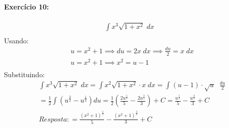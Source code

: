 \documentclass[12pt]{article}
\begin{document}
\paragraph{Exercício 10:}
\begin{align*}
\int x^{3}\sqrt{1+x^{2}}\;dx\\
\end{align*}
Usando:
\begin{align*}
&u = x^{2}+1\implies du = 2x\;dx \implies \frac{du}{2} = x\;dx \\ 
&u= x^{2}+1\implies x^{2} = u-1\\
\end{align*}
Substituindo:
\begin{align*}
&\int x^{3}\sqrt{1+x^{2}}\;dx = \int x^{2}\sqrt{1+x^{2}}\cdot x\;dx = \int \left ( u-1 \right )\cdot \sqrt{u} \;\; \frac{du}{2}\\
&=\frac{1}{2}\int \left ( u^{\frac{3}{2}} -u^{\frac{1}{2}}\right )du = \frac{1}{2}\left ( \frac{2u^{\frac{5}{2}}}{5}-\frac{2u^{\frac{3}{2}}}{3} \right )+C 
= \frac{u^{\frac{5}{2}}}{5}-\frac{u^{\frac{3}{2}}}{3}+C\\
&Resposta: = \frac{\left ( x^{2}+1 \right )^{\frac{5}{2}}}{5}-\frac{\left ( x^{2}+1 \right )^{\frac{3}{2}}}{3}+C\\
\end{align*}

\end{document}
